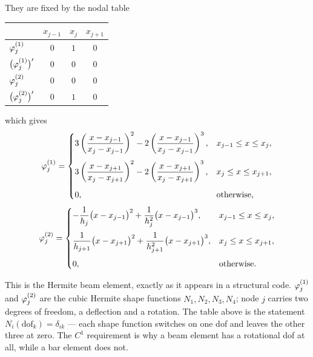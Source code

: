 \noindent
They are fixed by the nodal table
\begin{center}\small
\renewcommand{\arraystretch}{1.35}
\begin{tabular}{@{}l|ccc@{}}
\toprule
 & $x_{j-1}$ & $x_{j}$ & $x_{j+1}$\\
\midrule
$\varphi_{j}^{(1)}$      & $0$ & $1$ & $0$\\
$\bigl(\varphi_{j}^{(1)}\bigr)'$ & $0$ & $0$ & $0$\\
$\varphi_{j}^{(2)}$      & $0$ & $0$ & $0$\\
$\bigl(\varphi_{j}^{(2)}\bigr)'$ & $0$ & $1$ & $0$\\
\bottomrule
\end{tabular}
\end{center}

\noindent
which gives
\begin{equation}\label{eq:l11phi1}
  \varphi_{j}^{(1)}=
  \begin{cases}
    3\left(\dfrac{x-x_{j-1}}{x_{j}-x_{j-1}}\right)^{2}
      -2\left(\dfrac{x-x_{j-1}}{x_{j}-x_{j-1}}\right)^{3},
      & x_{j-1}\le x\le x_{j},\\[3ex]
    3\left(\dfrac{x-x_{j+1}}{x_{j}-x_{j+1}}\right)^{2}
      -2\left(\dfrac{x-x_{j+1}}{x_{j}-x_{j+1}}\right)^{3},
      & x_{j}\le x\le x_{j+1},\\[3ex]
    0, & \text{otherwise,}
  \end{cases}
\end{equation}
\begin{equation}\label{eq:l11phi2}
  \varphi_{j}^{(2)}=
  \begin{cases}
    -\dfrac{1}{h_{j}}\bigl(x-x_{j-1}\bigr)^{2}
      +\dfrac{1}{h_{j}^{2}}\bigl(x-x_{j-1}\bigr)^{3},
      & x_{j-1}\le x\le x_{j},\\[3ex]
    \dfrac{1}{h_{j+1}}\bigl(x-x_{j+1}\bigr)^{2}
      +\dfrac{1}{h_{j+1}^{2}}\bigl(x-x_{j+1}\bigr)^{3},
      & x_{j}\le x\le x_{j+1},\\[3ex]
    0, & \text{otherwise.}
  \end{cases}
\end{equation}

\medskip\noindent{}

\begin{mechanics}
This is the Hermite beam element, exactly as it appears in a structural code.
$\varphi_{j}^{(1)}$ and $\varphi_{j}^{(2)}$ are the cubic Hermite shape functions
$N_{1},N_{2},N_{3},N_{4}$; node $j$ carries two degrees of freedom, a deflection
and a rotation. The table above is the statement $N_{i}(\text{dof}_{k})=
\delta_{ik}$ --- each shape function switches on one dof and leaves the other
three at zero. The $C^{1}$ requirement is why a beam element has a rotational
dof at all, while a bar element does not.
\end{mechanics}

